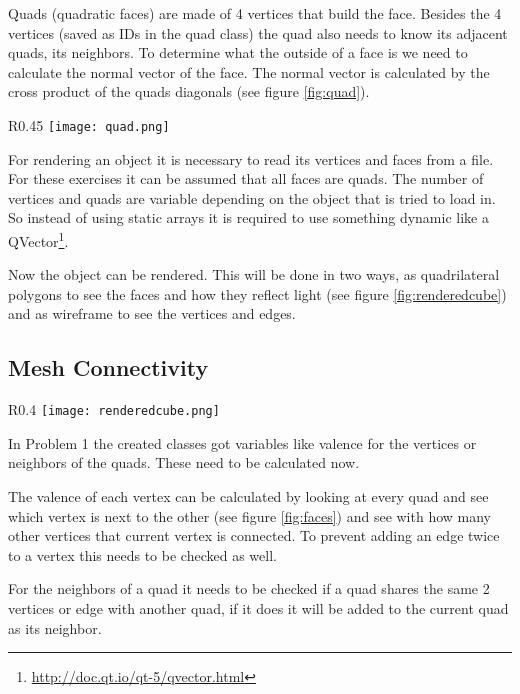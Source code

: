 \documentclass[11.5pt,oneside,a4paper]{scrartcl}
\newcounter{ct}
\begin{document}
Quads (quadratic faces) are made of 4 vertices that build the face. Besides the 4 vertices (saved as IDs in the quad class) the quad also needs to know its adjacent quads, its neighbors. To determine what the outside of a face is we need to calculate the normal vector of the face. The normal vector is calculated by the cross product of the quads diagonals (see figure \ref{fig:quad}).

\begin{wrapfigure}{R}{0.45\textwidth}
	\centering
	\texttt{[image: quad.png]}
	\caption{Quad with a normal vector in the center of it}
	\label{fig:quad}
	\vspace{-1cm}
\end{wrapfigure}

For rendering an object it is necessary to read its vertices and faces from a file. For these exercises it can be assumed that all faces are quads. The number of vertices and quads are variable depending on the object that is tried to load in. So instead of using static arrays it is required to use something dynamic like a QVector\footnote{\url{http://doc.qt.io/qt-5/qvector.html}}.

Now the object can be rendered. This will be done in two ways, as quadrilateral polygons to see the faces and how they reflect light (see figure \ref{fig:renderedcube}) and as wireframe to see the vertices and edges.

\subsection{Mesh Connectivity}

\begin{wrapfigure}{R}{0.4\textwidth}
	\centering
	\texttt{[image: renderedcube.png]}
	\caption{Render of an example cube}
	\label{fig:renderedcube}
\end{wrapfigure}

In Problem 1 the created classes got variables like valence for the vertices or neighbors of the quads. These need to be calculated now.


The valence of each vertex can be calculated by looking at every quad and see which vertex is next to the other (see figure \ref{fig:faces}) and see with how many other vertices that current vertex is connected. To prevent adding an edge twice to a vertex this needs to be checked as well.

For the neighbors of a quad it needs to be checked if a quad shares the same 2 vertices or edge with another quad, if it does it will be added to the current quad as its neighbor.
\end{document}
